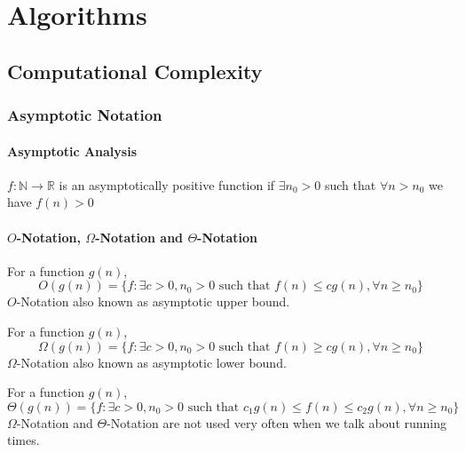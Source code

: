 

\part{Algorithms}
	\chapter{Computational Complexity}
		\section{Asymptotic Notation}
			\subsection{Asymptotic Analysis}
				\begin{definition}
					$f: \mathbb{N} \rightarrow \mathbb{R}$ is an asymptotically positive function if $\exists n_0 > 0$ such that $\forall n > n_0$ we have $f(n) > 0$
				\end{definition}

			\subsection{\texorpdfstring{$O$}{O}-Notation, \texorpdfstring{$\Omega$}{Omega}-Notation and \texorpdfstring{$\Theta$}{Theta}-Notation}
				\begin{definition}[$O$-Notation]
					For a function $g(n)$, 
					\begin{equation*}
						O(g(n)) = \{f: \exists c > 0, n_0 > 0 \text{ such that } f(n) \le cg(n), \forall n\ge n_0\}
					\end{equation*}
					$O$-Notation also known as asymptotic upper bound. 
				\end{definition}				

				\begin{definition}
					For a function $g(n)$, 
					\begin{equation*}
						\Omega(g(n)) = \{f: \exists c > 0, n_0 > 0 \text{ such that } f(n) \ge cg(n), \forall n\ge n_0\}
					\end{equation*}
					$\Omega$-Notation also known as asymptotic lower bound.
				\end{definition}
				
				\begin{definition}
					For a function $g(n)$, 
					\begin{equation*}
						\Theta(g(n)) = \{f: \exists c > 0, n_0 > 0 \text{ such that }  c_1g(n) \le f(n) \le c_2g(n), \forall n\ge n_0\}
					\end{equation*}
					$\Omega$-Notation and $\Theta$-Notation are not used very often when we talk about running times.
				\end{definition}
				
